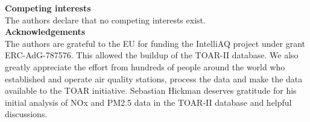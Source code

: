 \documentclass[gmd, manuscript]{copernicus}
\begin{document}
\textbf{Competing interests}\\The authors declare that no competing interests exist.\\ %

\textbf{Acknowledgements}\\
The authors are grateful to the EU for funding the IntelliAQ project under grant ERC-AdG-787576. This allowed the buildup of the TOAR-II database. We also greatly appreciate the effort from hundreds of people around the world who established and operate air quality stations, process the data and make the data available to the TOAR initiative. Sebastian Hickman deserves gratitude for his initial analysis of NOx and PM2.5 data in the TOAR-II database and helpful discussions.




\end{document}
